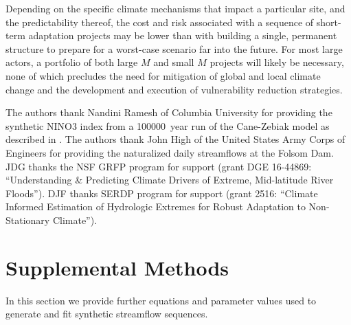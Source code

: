 \documentclass[
]{agujournal2018}
\begin{document}
Depending on the specific climate mechanisms that impact a particular site, and the predictability thereof, the cost and risk associated with a sequence of short-term adaptation projects may be lower than with building a single, permanent structure to prepare for a worst-case scenario far into the future.
For most large actors, a portfolio of both large $M$ and small $M$ projects will likely be necessary, none of which precludes the need for mitigation of global and local climate change and the development and execution of vulnerability reduction strategies.


\acknowledgments

The authors thank Nandini Ramesh of Columbia University for providing the synthetic NINO3 index from a \SI{100000}{year} run of the Cane-Zebiak model as described in \citet{Ramesh:2016hf}.
The authors thank John High of the United States Army Corps of Engineers for providing the naturalized daily streamflows at the Folsom Dam.
JDG thanks the NSF GRFP program for support (grant DGE 16-44869: ``Understanding \& Predicting Climate Drivers of Extreme, Mid-latitude River Floods'').
DJF thanks SERDP program for support (grant 2516: ``Climate Informed Estimation of Hydrologic Extremes for Robust Adaptation to Non-Stationary Climate'').




\clearpage
\appendix

\renewcommand{\thefigure}{S\arabic{figure}}
\setcounter{figure}{0}
\renewcommand{\theequation}{S\arabic{equation}}
\setcounter{equation}{0}
\renewcommand{\thetable}{S\arabic{table}}
\setcounter{table}{0}

\section{Supplemental Methods}\label{sec:supp-methods}

In this section we provide further equations and parameter values used to generate and fit synthetic streamflow sequences.
\end{document}
